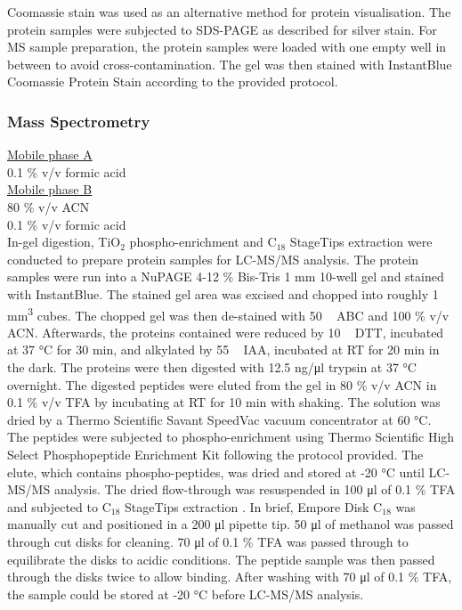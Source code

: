 Coomassie stain was used as an alternative method for protein visualisation. The protein samples were subjected to SDS-PAGE as described for silver stain. For MS sample preparation, the protein samples were loaded with one empty well in between to avoid cross-contamination. The gel was then stained with InstantBlue Coomassie Protein Stain according to the provided protocol. 

\subsubsection{Mass Spectrometry}

\underline{Mobile phase A}\\
0.1 \% v/v formic acid\\

\underline{Mobile phase B}\\
80 \% v/v ACN\\
0.1 \% v/v formic acid\\

In-gel digestion, TiO$_{2}$ phospho-enrichment and C$_{18}$ StageTips extraction were conducted to prepare protein samples for LC-MS/MS analysis. The protein samples were run into a NuPAGE 4-12 \% Bis-Tris 1 \si{\milli\metre} 10-well gel and stained with InstantBlue. The stained gel area was excised and chopped into roughly 1 \si{\milli\metre^3} cubes. The chopped gel was then de-stained with 50 \si{\milli\Molar} ABC and 100 \% v/v ACN. Afterwards, the proteins contained were reduced by 10 \si{\milli\Molar} DTT, incubated at 37 \si{\celsius} for 30 \si{\minute}, and alkylated by 55 \si{\milli\Molar} IAA, incubated at RT for 20 \si{\minute} in the dark. The proteins were then digested with 12.5 \si{\nano\gram/\micro\litre} trypsin at 37 \si{\celsius} overnight. The digested peptides were eluted from the gel in 80 \% v/v ACN in 0.1 \% v/v TFA by incubating at RT for 10 \si{\minute} with shaking. The solution was dried by a Thermo Scientific Savant SpeedVac vacuum concentrator at 60 \si{\celsius}. The peptides were subjected to phospho-enrichment using Thermo Scientific High Select Phosphopeptide Enrichment Kit following the protocol provided. The elute, which contains phospho-peptides, was dried and stored at -20 \si{\celsius} until LC-MS/MS analysis. The dried flow-through was resuspended in 100 \si{\micro\litre} of 0.1 \% TFA and subjected to C$_{18}$ StageTips extraction \citep{Rappsilber2007ProtocolStageTips}. In brief, Empore Disk C$_{18}$ was manually cut and positioned in a 200 \si{\micro\litre} pipette tip. 50 \si{\micro\litre} of methanol was passed through cut disks for cleaning. 70 \si{\micro\litre} of 0.1 \% TFA was passed through to equilibrate the disks to acidic conditions. The peptide sample was then passed through the disks twice to allow binding. After washing with 70 \si{\micro\litre} of 0.1 \% TFA, the sample could be stored at -20 \si{\celsius} before LC-MS/MS analysis. 

